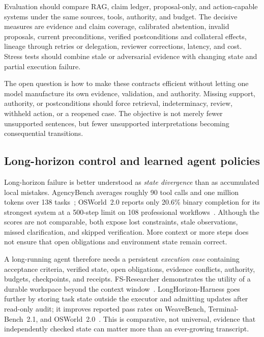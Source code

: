 Evaluation should compare RAG, claim ledger, proposal-only, and action-capable systems under the same sources, tools, authority, and budget. The decisive measures are evidence and claim coverage, calibrated abstention, invalid proposals, current preconditions, verified postconditions and collateral effects, lineage through retries or delegation, reviewer corrections, latency, and cost. Stress tests should combine stale or adversarial evidence with changing state and partial execution failure.

The open question is how to make these contracts efficient without letting one model manufacture its own evidence, validation, and authority. Missing support, authority, or postconditions should force retrieval, indeterminacy, review, withheld action, or a reopened case. The objective is not merely fewer unsupported sentences, but fewer unsupported interpretations becoming consequential transitions.

\subsection{Long-horizon control and learned agent policies}

Long-horizon failure is better understood as \emph{state divergence} than as accumulated local mistakes. AgencyBench averages roughly 90 tool calls and one million tokens over 138 tasks~\cite{li2026agencybench}; OSWorld~2.0 reports only 20.6\% binary completion for its strongest system at a 500-step limit on 108 professional workflows~\cite{yuan2026osworld2}. Although the scores are not comparable, both expose lost constraints, stale observations, missed clarification, and skipped verification. More context or more steps does not ensure that open obligations and environment state remain correct.

A long-running agent therefore needs a persistent \emph{execution case} containing acceptance criteria, verified state, open obligations, evidence conflicts, authority, budgets, checkpoints, and receipts. FS-Researcher demonstrates the utility of a durable workspace beyond the context window~\cite{zhu2026fsresearcher}. LongHorizon-Harness goes further by storing task state outside the executor and admitting updates after read-only audit; it improves reported pass rates on WeaveBench, Terminal-Bench~2.1, and OSWorld~2.0~\cite{ma2026longhorizon}. This is comparative, not universal, evidence that independently checked state can matter more than an ever-growing transcript.


